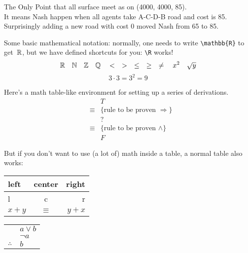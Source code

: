 \documentclass[
  course = {{IE579 Game Theory and Multi-Agent Reinforcement Learning}},
  assignment = 1,
  name = {{Mohammad Mahdi Rahimi}},
  studentnumber = {{20208244}},
  email = {{mahi@kaist.ac.kr}},
  firstexercise = 1
]{aga-homework}
\begin{document}
\begin{center}
\end{center}
The Only Point that all surface meet as on (4000, 4000, 85).\\
It means Nash happen when all agents take A-C-D-B road and cost is 85.\\
Surprisingly adding a new road with cost 0 moved Nash from 65 to 85.

\subexercise
Some basic mathematical notation: normally, one needs to write \texttt{\textbackslash{}mathbb\{R\}} to get~${\mathbb R}$, but we have defined shortcuts for you: \texttt{\textbackslash{}R} works!
\[ {\mathbb R} \quad {\mathbb N} \quad {\mathbb Z} \quad {\mathbb Q} \quad < \quad > \quad \leq \quad \geq \quad \neq \quad x^2 \quad \sqrt{y} \]
\[ 3 \cdot 3 = 3^2 = 9 \]

\subexercise
Here's a math table-like environment for setting up a series of derivations.
\begin{eqnarray*}
  && T \\
  &\equiv& \{ \text{rule to be proven } \Rightarrow \} \\
  && ? \\
  &\equiv& \{ \text{rule to be proven } \wedge \} \\
  && F
\end{eqnarray*}

But if you don't want to use (a lot of) math inside a table, a normal table also works:
\begin{center}
  \begin{tabular}{lcr}
    \toprule
    left & center & right \\
    \midrule
    l & c & r \\
    $x+y$ & $\equiv$ & $y + x$ \\
    \bottomrule
  \end{tabular}
  \hspace{5em}
  \begin{tabular}{rl}
    & $a \vee b$ \\
    & $\neg a$ \\
    \hline
    $\therefore$ & $b$
  \end{tabular}
\end{center}
\end{document}
